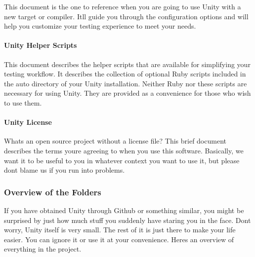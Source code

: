 This document is the one to reference when you are going to use Unity with a new target or compiler. It\textquotesingle{}ll guide you through the configuration options and will help you customize your testing experience to meet your needs.

\paragraph*{Unity Helper Scripts}

This document describes the helper scripts that are available for simplifying your testing workflow. It describes the collection of optional Ruby scripts included in the auto directory of your Unity installation. Neither Ruby nor these scripts are necessary for using Unity. They are provided as a convenience for those who wish to use them.

\paragraph*{Unity License}

What\textquotesingle{}s an open source project without a license file? This brief document describes the terms you\textquotesingle{}re agreeing to when you use this software. Basically, we want it to be useful to you in whatever context you want to use it, but please don\textquotesingle{}t blame us if you run into problems.

\subsubsection*{Overview of the Folders}

If you have obtained Unity through Github or something similar, you might be surprised by just how much stuff you suddenly have staring you in the face. Don\textquotesingle{}t worry, Unity itself is very small. The rest of it is just there to make your life easier. You can ignore it or use it at your convenience. Here\textquotesingle{}s an overview of everything in the project.


